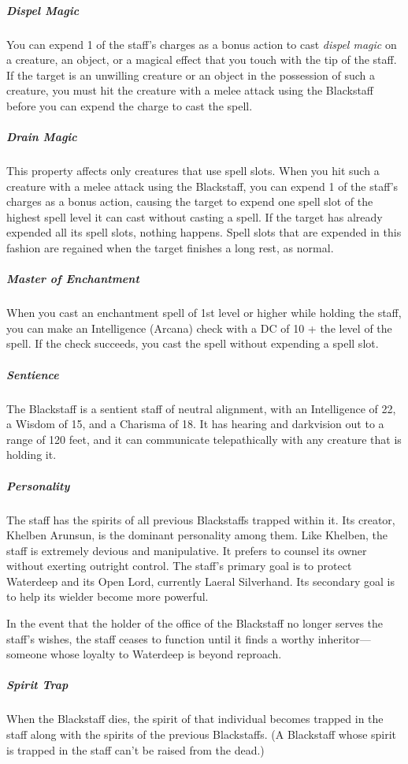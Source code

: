 \documentclass[10pt,a4paper,twoside,bg=print,twocolumn,openany,nodeprecatedcode]{dndbook}
\begin{document}
\subparagraph{Dispel Magic}
You can expend 1 of the staff's charges as a bonus action to cast \textit{dispel magic} on a creature, an object, or a magical effect that you touch with the tip of the staff. If the target is an unwilling creature or an object in the possession of such a creature, you must hit the creature with a melee attack using the Blackstaff before you can expend the charge to cast the spell.

\subparagraph{Drain Magic}
This property affects only creatures that use spell slots. When you hit such a creature with a melee attack using the Blackstaff, you can expend 1 of the staff's charges as a bonus action, causing the target to expend one spell slot of the highest spell level it can cast without casting a spell. If the target has already expended all its spell slots, nothing happens. Spell slots that are expended in this fashion are regained when the target finishes a long rest, as normal.

\subparagraph{Master of Enchantment}
When you cast an enchantment spell of 1st level or higher while holding the staff, you can make an Intelligence (Arcana) check with a DC of 10 + the level of the spell. If the check succeeds, you cast the spell without expending a spell slot.

\subparagraph{Sentience}
The Blackstaff is a sentient staff of neutral alignment, with an Intelligence of 22, a Wisdom of 15, and a Charisma of 18. It has hearing and darkvision out to a range of 120 feet, and it can communicate telepathically with any creature that is holding it.

\subparagraph{Personality}
The staff has the spirits of all previous Blackstaffs trapped within it. Its creator, Khelben Arunsun, is the dominant personality among them. Like Khelben, the staff is extremely devious and manipulative. It prefers to counsel its owner without exerting outright control. The staff's primary goal is to protect Waterdeep and its Open Lord, currently Laeral Silverhand. Its secondary goal is to help its wielder become more powerful.

In the event that the holder of the office of the Blackstaff no longer serves the staff's wishes, the staff ceases to function until it finds a worthy inheritor—someone whose loyalty to Waterdeep is beyond reproach.

\subparagraph{Spirit Trap}
When the Blackstaff dies, the spirit of that individual becomes trapped in the staff along with the spirits of the previous Blackstaffs. (A Blackstaff whose spirit is trapped in the staff can't be raised from the dead.)
\end{document}
